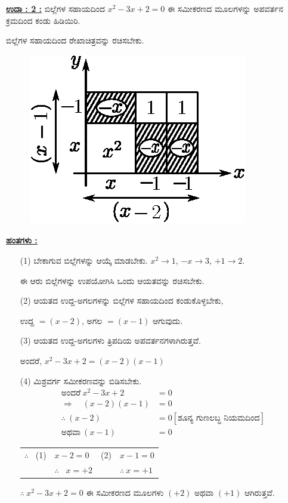 \noindent
{\textbf{\underline{ಉದಾ : 2 :}}} ಬಿಲ್ಲೆಗಳ ಸಹಾಯದಿಂದ $x^2 - 3x + 2 = 0$ ಈ ಸಮೀಕರಣದ ಮೂಲ\-ಗಳನ್ನು ಅಪವರ್ತನ ಕ್ರಮದಿಂದ ಕಂಡು ಹಿಡಿಯಿರಿ. 

ಬಿಲ್ಲೆಗಳ ಸಹಾಯದಿಂದ ರೇಖಾಚಿತ್ರವನ್ನು ರಚಿಸಬೇಕು.
\begin{figure}[H]
\centering
\includegraphics[scale=0.8]{src/figure/chap3/fig3-52.eps}
\end{figure}

\noindent
{\textbf{\underline{ಹಂತಗಳು :}}}
\begin{itemize}
\item [(1)] ಬೇಕಾಗುವ ಬಿಲ್ಲೆಗಳನ್ನು ಆಯ್ಕೆ ಮಾಡಬೇಕು. $x^2 \rightarrow 1$, $-x \rightarrow 3$, $+1 \rightarrow 2$.

ಈ ಆರು ಬಿಲ್ಲೆಗಳನ್ನು ಉಪಯೋಗಿಸಿ ಒಂದು ಆಯತವನ್ನು ರಚಿಸಬೇಕು. 
\item [(2)] ಆಯತದ ಉದ್ದ-ಅಗಲಗಳನ್ನು ಬಿಲ್ಲೆಗಳ ಸಹಾಯದಿಂದ ಕಂಡುಕೊಳ್ಳಬೇಕು, 

ಉದ್ದ $= (x-2)$, ಅಗಲ $= (x-1)$ ಆಗುವುದು. 
\item [(3)] ಆಯತದ ಉದ್ದ-ಅಗಲಗಳು ತ್ರಿಪದಿಯ ಅಪವರ್ತನಗಳಾಗಿರುತ್ತವೆ. 

ಅಂದರೆ, $x^2-3x+2 = (x-2)(x-1)$
\item [(4)] ಮಿಶ್ರವರ್ಗ ಸಮೀಕರಣವನ್ನು ಬಿಡಿಸಬೇಕು. 
\begin{align*}
\text{ಅಂದರೆ}~ x^2 - 3x + 2 & = 0\\
\Rightarrow\quad (x-2)(x-1) & = 0\\
\therefore~ (x-2) & = 0\tag{1} [\text{ಶೂನ್ಯ ಗುಣಲಬ್ಧ ನಿಯಮದಿಂದ}]\\
\text{ಅಥವಾ}~ (x - 1) & = 0\tag{2}
\end{align*}

\begin{tabular}{llll}
$\therefore$~ (1) & $x - 2 = 0$ & (2) & $x-1 = 0$\\
& $\therefore$~ $x = +2$ & &$\therefore~ x = +1$
\end{tabular}

$\therefore~ x^2-3x+2 = 0$ ಈ ಸಮೀಕರಣದ ಮೂಲಗಳು $(+2)$ ಅಥವಾ $(+1)$ ಆಗಿರುತ್ತವೆ.
\end{itemize}

